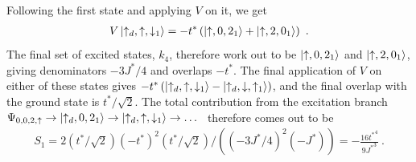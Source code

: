 Following the first state and applying \(V\) on it, we get
\begin{equation}\begin{aligned}
	V\ket{\uparrow_d,\uparrow,\downarrow_1} = -t^* \left(\ket{\uparrow,0,2_1} + \ket{\uparrow, 2, 0_1}\right)~.
\end{aligned}\end{equation}
The final set of excited states, \(k_4\), therefore work out to be \(\ket{\uparrow,0,2_1}\) and \(\ket{\uparrow, 2, 0_1}\), giving denominators \(-3J^*/4\) and overlaps \(-t^*\). The final application of \(V\) on either of these states gives \(-t^*\left(\ket{\uparrow_d,\uparrow,\downarrow_1} - \ket{\uparrow_d,\downarrow,\uparrow_1}\right)\), and the final overlap with the ground state is \(t^*/\sqrt 2\). The total contribution from the excitation branch \(\Psi_{0,0,2,\uparrow} \to \ket{\uparrow_d,0,2_1} \to \ket{\uparrow_d,\uparrow,\downarrow_1} \to \ldots\)~ therefore comes out to be
\begin{equation}\begin{aligned}
	S_1 = 2 (t^*/\sqrt 2) (-t^*)^2 (t^*/\sqrt 2) / ((-3J^*/4)^2 (-J^*)) = -\frac{16{t^*}^4}{9{J^*}^3}~.
\end{aligned}\end{equation}

